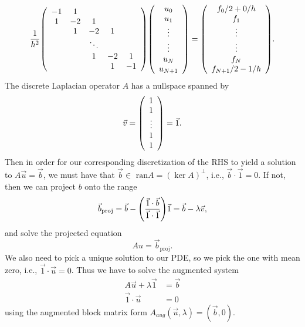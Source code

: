 \documentclass[12pt]{article}
\def\ran{\text{ ran}}
\begin{document}
 \begin{align*}
             \frac{1}{h^2}\qty(\begin{array}{ccccc}
                -1 & 1 & & & \\
                1 & -2 & 1  & & \\
                & 1 & -2 & 1  \\
                & & \ddots & & \\
                & & 1 & -2 & 1 \\
                & & & 1 & -1
            \end{array})
            \qty(\begin{array}{c}
            u_0 \\
            u_1 \\
            \vdots \\
            \vdots \\
            u_N \\
            u_{N+1}
            \end{array})
            = \qty(\begin{array}{c}
            f_0/2 + 0/h \\
            f_1 \\
            \vdots \\
            \vdots \\
            f_N \\
            f_{N+1}/2 - 1/h
            \end{array}).
  \end{align*}
The discrete Laplacian operator $A$ has a nullspace spanned by 
        \begin{align*}
            \vec{v} = \qty(\begin{array}{c}
                1 \\ 1 \\ \vdots \\ 1 \\ 1
            \end{array}) = \vec{1}.
        \end{align*}
Then in order for our corresponding discretization of the RHS to yield a solution to $A\vec{u} = \vec{b}$, we must have that $\vec{b} \in \ran{A} = (\ker{A})^\perp$, i.e., $\vec{b} \cdot \vec{1} = 0$.  If not, then we can project $b$ onto the range 
$$\vec{b}_{\text{proj}} = \vec{b} - \qty(\dfrac{\vec{1}\cdot\vec{b}}{\vec{1}\cdot\vec{1}})\vec{1} = \vec{b} - \lambda \vec{v},$$ and solve the projected equation $$Au = \vec{b}_{\text{proj}}.$$
We also need to pick a unique solution to our PDE, so we pick the one with mean zero, i.e., $\vec{1} \cdot \vec{u} = 0$.  Thus we have to solve the augmented system
 \begin{align*}
A\vec{u} + \lambda \vec{1} &= \vec{b} \\
\vec{1} \cdot \vec{u} &= 0
 \end{align*}
 using the augmented block matrix form $A_{aug} (\vec{u}, \lambda) = (\vec{b}, 0)$.
\end{document}

